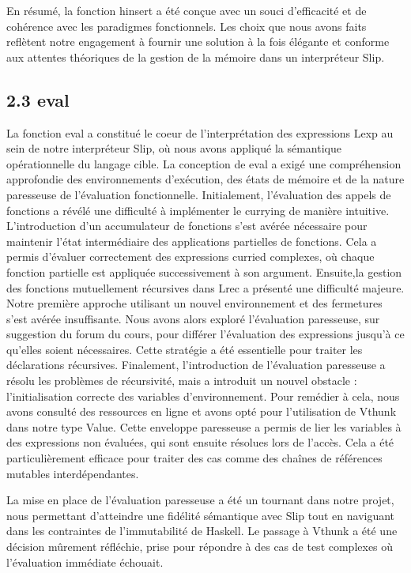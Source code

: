 \documentclass[10pt]{article}
\begin{document}
En résumé, la fonction hinsert a été conçue avec un souci d'efficacité et de cohérence avec les paradigmes fonctionnels. Les choix que nous avons faits reflètent notre engagement à fournir une solution à la fois élégante et conforme aux attentes théoriques de la gestion de la mémoire dans un interpréteur Slip.

\subsection*{2.3 eval}

La fonction eval a constitué le coeur de l'interprétation des expressions Lexp au sein de notre interpréteur Slip, où nous avons appliqué la sémantique opérationnelle du langage cible. La conception de eval a exigé une compréhension approfondie des environnements d'exécution, des états de mémoire et de la nature paresseuse de l'évaluation fonctionnelle. Initialement, l'évaluation des appels de fonctions a révélé une difficulté à implémenter le currying de manière intuitive. L'introduction d'un accumulateur de fonctions s'est avérée nécessaire pour maintenir l'état intermédiaire des applications partielles de fonctions. Cela a permis d'évaluer correctement des expressions curried complexes, où chaque fonction partielle est appliquée successivement à son argument. Ensuite,la gestion des fonctions mutuellement récursives dans Lrec a présenté une difficulté majeure. Notre première approche utilisant un nouvel environnement et des fermetures s'est avérée insuffisante. Nous avons alors exploré l'évaluation paresseuse, sur suggestion du forum du cours, pour différer l'évaluation des expressions jusqu'à ce qu'elles soient nécessaires. Cette stratégie a été essentielle pour traiter les déclarations récursives. Finalement, l'introduction de l'évaluation paresseuse a résolu les problèmes de récursivité, mais a introduit un nouvel obstacle : l'initialisation correcte des variables d'environnement. Pour remédier à cela, nous avons consulté des ressources en ligne et avons opté pour l'utilisation de Vthunk dans notre type Value. Cette enveloppe paresseuse a permis de lier les variables à des expressions non évaluées, qui sont ensuite résolues lors de l'accès. Cela a été particulièrement efficace pour traiter des cas comme des chaînes de références mutables interdépendantes.

La mise en place de l'évaluation paresseuse a été un tournant dans notre projet, nous permettant d'atteindre une fidélité sémantique avec Slip tout en naviguant dans les contraintes de l'immutabilité de Haskell. Le passage à Vthunk a été une décision mûrement réfléchie, prise pour répondre à des cas de test complexes où l'évaluation immédiate échouait.
\end{document}

